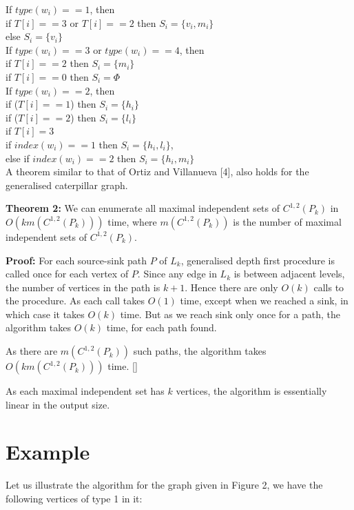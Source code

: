 \documentclass[10pt]{article}
\begin{document}
\noindent If $type(w_i)==1$, then \\ if $T[i]==3$ or $T[i]==2$ then
$S_i=\{v_i,m_i\}$\\ else $S_i=\{v_i\}$\\

  
\noindent If $type(w_i)==3$ or $type(w_i)==4$, then\\ if $T[i]==2$ then
$S_i=\{m_i\}$\\ if $T[i]==0$ then $S_i=\Phi$\\

\noindent If $type(w_i)==2$, then \\ if ($T[i]==1$) then $S_i=\{h_i\}$\\ if
($T[i]==2$) then $S_i=\{l_i\}$\\ if $T[i]=3$\\ \indent if $index(w_i)==1$
then $S_i=\{h_i,l_i\}$,\\ \indent else if $index(w_i)==2$ then
$S_i=\{h_i,m_i\}$\\


A theorem similar to that of Ortiz and Villanueva [4], also holds for the
generalised caterpillar graph.

{\textbf{Theorem 2:}} We can enumerate all maximal independent sets of
$C^{1,2}(P_k)$ in $O(k m(C^{1,2}(P_k)))$ time, where $m(C^{1,2}(P_k))$ is
the number of maximal independent sets of $C^{1,2}(P_k)$.


{\textbf{Proof:}} For each source-sink path $P$ of $L_k$, generalised
depth first procedure is called once for each vertex of $P$. Since any
edge in $L_k$ is between adjacent levels, the number of vertices in the
path is $k+1$. Hence there are only $O(k)$ calls to the procedure.  As
each call takes $O(1)$ time, except when we reached a sink, in which case
it takes $O(k)$ time. But as we reach sink only once for a path, the
algorithm takes $O(k)$ time, for each path found. 

As there are $m(C^{1,2}(P_k))$ such paths, the algorithm takes $O(k 
m(C^{1,2}(P_k)) )$ time. []

As each maximal independent set has $k$ vertices, the algorithm is
essentially linear in the output size.

\section{Example}

Let us illustrate the algorithm for the graph given in Figure 2, we have
the following vertices of type 1 in it:
\end{document}
